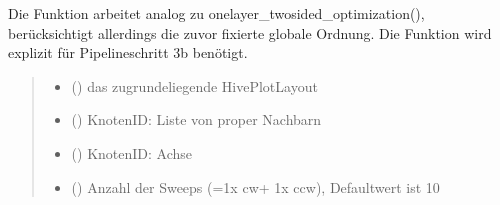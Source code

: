 \documentclass[a4paper,10pt,ngerman]{sphinxmanual}
\begin{document}
\begin{fulllineitems}
\label{\detokenize{api:src.ip_model.onelayer_twosided_optimization_3b}}
\pysigstartsignatures
\pysiglinewithargsret
{}
{\sphinxparamcomma {}\sphinxparamcomma {}\sphinxparamcomma {}\sphinxparamcomma {}\sphinxparamcomma {}}
{}
\pysigstopsignatures
\sphinxAtStartPar
Die Funktion arbeitet analog zu onelayer\_twosided\_optimization(), berücksichtigt allerdings die zuvor fixierte globale Ordnung. Die Funktion wird explizit für Pipelineschritt 3b benötigt.
\begin{quote}\begin{description}
\begin{itemize}
\item {} 
\sphinxAtStartPar
{} () \textendash{} das zugrundeliegende HivePlotLayout

\item {} 
\sphinxAtStartPar
{} () \textendash{} KnotenID: Liste von proper Nachbarn

\item {} 
\sphinxAtStartPar
{} () \textendash{} KnotenID: Achse

\item {} 
\sphinxAtStartPar
{} () \textendash{} Anzahl der Sweeps (=1x cw+ 1x ccw), Defaultwert ist 10


\end{itemize}
\end{description}
\end{quote}
\end{fulllineitems}
\end{document}
